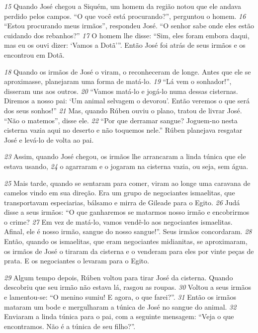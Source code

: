 \bigskip
\textit{\tiny 15}
Quando José chegou a Siquém, um homem da região notou que ele andava
perdido pelos campos. “O que você está procurando?”, perguntou o homem.
\textit{\tiny 16}
“Estou procurando meus irmãos”, respondeu José. “O senhor sabe onde eles
estão cuidando dos rebanhos?”
\textit{\tiny 17}
O homem lhe disse: “Sim, eles foram embora daqui, mas eu os ouvi dizer:
‘Vamos a Dotã’”. Então José foi atrás de seus irmãos e os encontrou em Dotã.
   
\bigskip
\textit{\tiny 18}
Quando os irmãos de José o viram, o reconheceram de longe. Antes que ele se
aproximasse, planejaram uma forma de matá-lo. 
\textit{\tiny 19}
“Lá vem o sonhador!”,
disseram uns aos outros. 
\textit{\tiny 20}
“Vamos matá-lo e jogá-lo numa dessas cisternas.
Diremos a nosso pai: ‘Um animal selvagem o devorou’. Então veremos o que será
dos seus sonhos!”
\textit{\tiny 21}
Mas, quando Rúben ouviu o plano, tratou de livrar José. “Não o matemos”,
disse ele. 
\textit{\tiny 22}
“Por que derramar sangue? Joguem-no nesta cisterna vazia aqui no
deserto e não toquemos nele.” Rúben planejava resgatar José e levá-lo de volta ao
pai.

\bigskip
\textit{\tiny 23}
Assim, quando José chegou, os irmãos lhe arrancaram a linda túnica que ele
estava usando, 
\textit{\tiny 24}
o agarraram e o jogaram na cisterna vazia, ou seja, sem água.

\bigskip
\textit{\tiny 25}
Mais tarde, quando se sentaram para comer, viram ao longe uma caravana de
camelos vindo em sua direção. Era um grupo de negociantes ismaelitas, que
transportavam especiarias, bálsamo e mirra de Gileade para o Egito.
\textit{\tiny 26}
Judá disse a seus irmãos: “O que ganharemos se matarmos nosso irmão e
encobrirmos o crime?
\textit{\tiny 27}
Em vez de matá-lo, vamos vendê-lo aos negociantes
ismaelitas. Afinal, ele é nosso irmão, sangue do nosso sangue!”. Seus irmãos
concordaram. 
\textit{\tiny 28}
Então, quando os ismaelitas, que eram negociantes midianitas, se
aproximaram, os irmãos de José o tiraram da cisterna e o venderam para eles por
vinte peças de prata. E os negociantes o levaram para o Egito.
   
\bigskip
\textit{\tiny 29}
Algum tempo depois, Rúben voltou para tirar José da cisterna. Quando
descobriu que seu irmão não estava lá, rasgou as roupas. 
\textit{\tiny 30}
Voltou a seus irmãos e
lamentou-se: “O menino sumiu! E agora, o que farei?”.
\textit{\tiny 31}
Então os irmãos mataram um bode e mergulharam a túnica de José no
sangue do animal. 
\textit{\tiny 32}
Enviaram a linda túnica para o pai, com a seguinte
mensagem: “Veja o que encontramos. Não é a túnica de seu filho?”.

